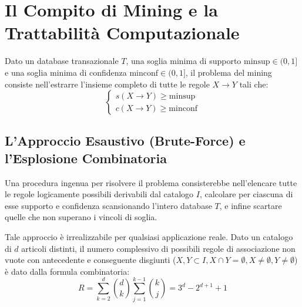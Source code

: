 \FloatBarrier
\section{Il Compito di Mining e la Trattabilità Computazionale}
\label{sec:dm-mining-task-complexity}

\begin{definition}
Dato un database transazionale $T$, una soglia minima di supporto $\mathrm{minsup} \in (0, 1]$ e una soglia minima di confidenza $\mathrm{minconf} \in (0, 1]$, il problema del mining consiste nell'estrarre l'insieme completo di tutte le regole $X \rightarrow Y$ tali che:
\begin{equation}
\label{eq:dm-mining-constraints}
\begin{cases}
s(X \longrightarrow Y) \ge \mathrm{minsup} \\
c(X \longrightarrow Y) \ge \mathrm{minconf}
\end{cases}
\end{equation}
\end{definition}

\FloatBarrier
\subsection{L'Approccio Esaustivo (Brute-Force) e l'Esplosione Combinatoria}
Una procedura ingenua per risolvere il problema consisterebbe nell'elencare tutte le regole logicamente possibili derivabili dal catalogo $I$, calcolare per ciascuna di esse supporto e confidenza scansionando l'intero database $T$, e infine scartare quelle che non superano i vincoli di soglia.

Tale approccio è irrealizzabile per qualsiasi applicazione reale. Dato un catalogo di $d$ articoli distinti, il numero complessivo di possibili regole di associazione non vuote con antecedente e conseguente disgiunti ($X, Y \subset I, X \cap Y = \emptyset, X \ne \emptyset, Y \ne \emptyset$) è dato dalla formula combinatoria:
\begin{equation}
\label{eq:dm-brute-force-rules-count}
R = \sum_{k=2}^d \binom{d}{k} \sum_{j=1}^{k-1} \binom{k}{j} = 3^d - 2^{d+1} + 1
\end{equation}

